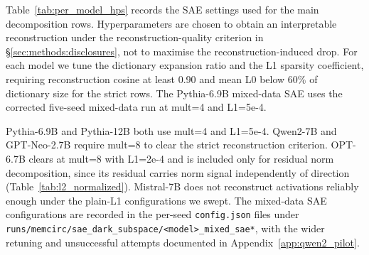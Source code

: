 Table~\ref{tab:per_model_hps} records the SAE settings used for the main decomposition rows. Hyperparameters are chosen to obtain an interpretable reconstruction under the reconstruction-quality criterion in \S\ref{sec:methods:disclosures}, not to maximise the reconstruction-induced drop. For each model we tune the dictionary expansion ratio and the L1 sparsity coefficient, requiring reconstruction cosine at least 0.90 and mean L0 below 60\% of dictionary size for the strict rows. The Pythia-6.9B mixed-data SAE uses the corrected five-seed mixed-data run at mult=4 and L1=5e-4.

Pythia-6.9B and Pythia-12B both use mult=4 and L1=5e-4. Qwen2-7B and GPT-Neo-2.7B require mult=8 to clear the strict reconstruction criterion. OPT-6.7B clears at mult=8 with L1=2e-4 and is included only for residual norm decomposition, since its residual carries norm signal independently of direction (Table~\ref{tab:l2_normalized}). Mistral-7B does not reconstruct activations reliably enough under the plain-L1 configurations we swept. The mixed-data SAE configurations are recorded in the per-seed \texttt{config.json} files under \texttt{runs/\allowbreak{}memcirc/\allowbreak{}sae\_\allowbreak{}dark\_\allowbreak{}subspace/\allowbreak{}<model>\_\allowbreak{}mixed\_\allowbreak{}sae*}, with the wider retuning and unsuccessful attempts documented in Appendix~\ref{app:qwen2_pilot}.

